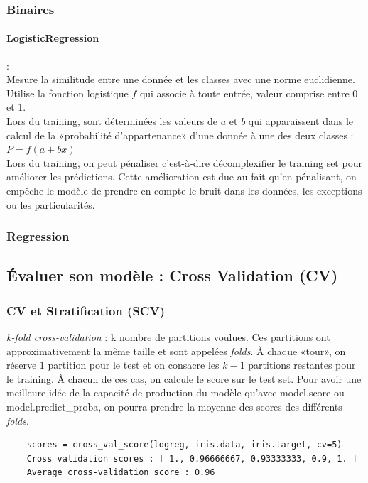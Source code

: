 \documentclass[a4paper,12pt]{report}
\newcommand{\bepar}[1]{
	\left( #1 \right)  
}
\newcommand\bk{\color{black}}
\newcommand\brick{\color{brick}}
\newcommand\navy{\color{navy}}
\newcommand{\cad}{c'est-à-dire}
\numberwithin{equation}{section} %
\begin{document}
\subsubsection{Binaires}
\navy \paragraph*{LogisticRegression} :\bk \\
\noindent Mesure la similitude entre une donnée et les classes avec une norme euclidienne.\\
Utilise la fonction logistique $f$ qui associe à toute entrée, valeur comprise entre 0 et 1.\\
Lors du training, sont déterminées les valeurs de $a$ et $b$ qui apparaissent dans le calcul de la «probabilité d'appartenance» d'une donnée à une des deux classes : $P = f\bepar{a+bx}$\\

\noindent Lors du training, on peut pénaliser \cad $ $ décomplexifier le training set pour améliorer les prédictions. Cette amélioration est due au fait qu'en pénalisant, on empêche le modèle de prendre en compte le bruit dans les données, les exceptions ou les particularités.
\subsubsection{Regression}
\brick \subsection{Évaluer son modèle : Cross Validation (CV)} \bk
\subsubsection{CV et Stratification (SCV)}
\textit{k-fold cross-validation} : k nombre de partitions voulues. Ces partitions ont approximativement la même taille et sont appelées \textit{folds}. À chaque «tour», on réserve $1$ partition pour le test et on consacre les $k-1$ partitions restantes pour le training.
À chacun de ces cas, on calcule le score sur le test set. Pour avoir une meilleure idée de la capacité de production du modèle qu'avec model.score ou model.predict\_proba, on pourra prendre la moyenne des scores des différents \textit{folds}.
\begin{lstlisting}
	scores = cross_val_score(logreg, iris.data, iris.target, cv=5)	
	Cross validation scores : [ 1., 0.96666667, 0.93333333, 0.9, 1. ]	
	Average cross-validation score : 0.96
\end{lstlisting}
\end{document}
